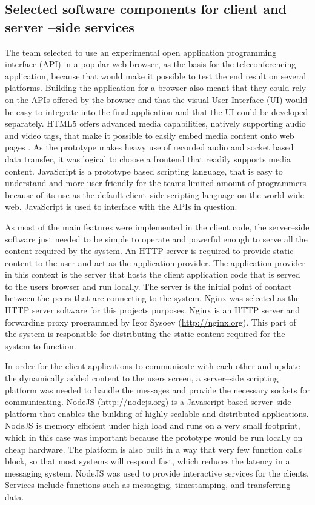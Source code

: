 \documentclass[english,12pt,a4paper,pdftex]{article}
\begin{document}
\subsection{Selected software components for client and server --side services}

The team selected to use an experimental open application programming interface (API) in a popular web browser, as the basis for the teleconferencing application, because that would make it possible to test the end result on several platforms. Building the application for a browser also meant that they could rely on the APIs offered by the browser and that the visual User Interface (UI) would be easy to integrate into the final application and that the UI could be developed separately. HTML5 offers advanced media capabilities, natively supporting audio and video tags, that make it possible to easily embed media content onto web pages \cite{Meyn}. As the prototype makes heavy use of recorded audio and socket based data transfer, it was logical to choose a frontend that readily supports media content. JavaScript is a prototype based scripting language, that is easy to understand and more user friendly for the teams limited amount of programmers because of its use as the default client--side scripting language on the world wide web. JavaScript is used to interface with the APIs in question.

As most of the main features were implemented in the client code, the server--side software just needed to be simple to operate and powerful enough to serve all the content required by the system. An HTTP server is required to provide static content to the user and act as the application provider. The application provider in this context is the server that hosts the client application code that is served to the users browser and run locally. The server is the initial point of contact between the peers that are connecting to the system. Nginx was selected as the HTTP server software for this projects purposes. Nginx is an HTTP server and forwarding proxy programmed by Igor Sysoev (\url{http://nginx.org}). This part of the system is responsible for distributing the static content required for the system to function.

In order for the client applications to communicate with each other and update the dynamically added content to the users screen, a server--side scripting platform was needed to handle the messages and provide the necessary sockets for communicating. NodeJS (\url{http://nodejs.org}) is a Javascript based server--side platform that enables the building of highly scalable and distributed applications. NodeJS is memory efficient under high load and runs on a very small footprint, which in this case was important because the prototype would be run locally on cheap hardware. The platform is also built in a way that very few function calls block, so that most systems will respond fast, which reduces the latency in a messaging system. NodeJS was used to provide interactive services for the clients. Services include functions such as messaging, timestamping, and transferring data.
\end{document}
